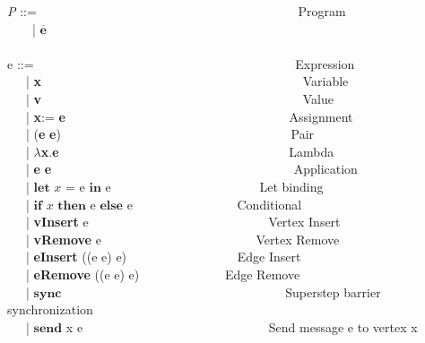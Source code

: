 \begin{frame}
  \tiny{
    \textit{P} ::= \ \ \ \ \ \ \ \ \ \ \ \ \ \ \ \ \ \ \ \ \ \ \ \ \ \ \ \ \ \ \ \ \ \ \ \ \ \ \ \ \ Program \\
    \ \ \ \  | $\overline {\textbf{e}}$ \\
\ \\
  e ::= \ \ \ \ \ \ \ \ \ \ \ \ \ \ \ \ \ \ \ \ \ \ \ \ \ \ \ \ \ \ \ \ \ \ \ \ \ \ \ \ \ Expression \\
  \ \ \ | \textbf{x} \ \ \ \ \ \ \ \ \ \ \  \ \ \ \ \ \ \ \ \ \ \ \ \ \ \ \ \ \ \ \ \ \ \ \ \ \ \ \ \ \ Variable \\
  \ \ \ | \textbf{v}  \ \ \ \ \ \ \ \ \ \ \ \  \ \ \ \ \ \ \ \ \ \ \ \ \ \ \ \ \ \ \ \ \ \ \ \ \ \ \ \ \ Value \\
  \ \ \ | \textbf{x}:= \textbf{e}   \ \ \ \ \ \ \ \ \ \ \ \  \ \ \ \ \ \ \ \ \ \ \ \ \ \ \ \ \ \ \ \ \ \ \ Assignment \\
  \ \ \ | (\textbf{e} \textbf{e})   \ \ \ \ \ \ \ \ \ \ \  \ \ \ \ \ \ \ \ \ \ \ \ \ \ \ \ \ \ \ \ \ \ \ \ \ Pair \\
  \ \ \ | $\lambda$\textbf{x}.\textbf{e}  \ \ \ \ \ \ \ \ \ \ \  \ \ \ \ \ \ \ \ \ \ \ \ \ \ \ \ \ \ \ \ \ \ \ \ \ Lambda \\
  \ \ \ | \textbf{e} \textbf{e}   \ \ \ \ \ \ \ \ \ \ \  \ \ \ \ \ \ \ \ \ \ \ \ \ \ \ \ \ \ \ \ \ \ \ \ \ \ \ Application \\
  \ \ \ |  $\textbf{let}$ $x$ $\textbf{=}$ e $\textbf{in}$ e  \ \ \ \ \ \ \ \ \ \ \ \ \ \ \ \ \ \ \ \ \ \ \ Let binding \\
  \ \ \ |  $\textbf{if}$ $x$ $\textbf{then}$ e $\textbf{else}$ e \ \ \ \ \ \ \ \ \ \ \ \ \ \ \ \ Conditional \\
  \ \ \ |  \textbf{vInsert} e  \ \ \ \ \ \ \ \ \ \ \ \ \ \ \ \ \ \ \ \ \ \ \ \ \ \ \ \ Vertex Insert \\
  \ \ \ |  \textbf{vRemove} e  \ \ \ \ \ \ \ \ \ \ \ \ \ \ \ \ \ \ \ \ \ \ \ \ Vertex Remove \\
  \ \ \ |  \textbf{eInsert} ((e e) e)  \ \ \ \ \ \ \ \ \ \ \ \ \ \ \ \ \ Edge Insert \\
  \ \ \ |  \textbf{eRemove} ((e e) e) \ \ \ \ \ \ \ \ \ \ \ \ \ Edge Remove \\
  \ \ \ |  $\textbf{sync}$ \ \ \ \ \ \ \ \  \ \ \ \ \ \ \  \ \ \ \ \ \ \ \  \ \ \ \ \ \ \ \ \ \ \ \ Superstep barrier synchronization\\
  \ \ \ |  $\textbf{send}$ x e \ \ \ \ \ \ \ \ \ \ \ \ \ \ \ \ \ \ \ \ \ \ \ \ \ \ \ \ \ Send message e to vertex x \\
}
\end{frame}
